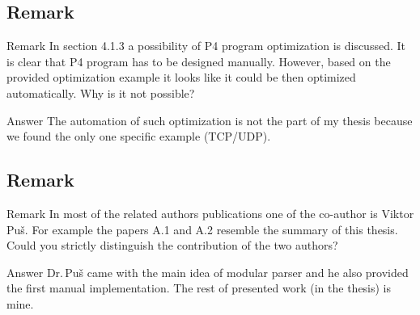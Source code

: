 \subsection{Remark \theRemarkCounter}
\begin{frame} %
    \begin{block}{Remark \theRemarkCounter}
        In section 4.1.3 a possibility of P4 program optimization is discussed. It is clear that P4
        program has to be designed manually. However, based on the provided optimization example it
        looks like it could be then optimized automatically. Why is it not possible?
    \end{block}
    
    \begin{exampleblock}{Answer}
        The automation of such optimization is not the part of my thesis because we found the only one specific example (TCP/UDP). 
    \end{exampleblock}

\end{frame}

\subsection{Remark \theRemarkCounter}
\begin{frame}[allowframebreaks]
    \begin{block}{Remark \theRemarkCounter}
            In most of the related authors publications one of the co-author is Viktor Puš.
            For example the papers A.1 and A.2 resemble the summary of this thesis. 
            Could you strictly distinguish the contribution of the two authors?
    \end{block}
    
    \begin{exampleblock}{Answer}
        Dr.\,Puš came with the main idea of modular parser and he also provided the first manual implementation. The rest of presented work (in the thesis) is mine.
    \end{exampleblock}  
\end{frame}

